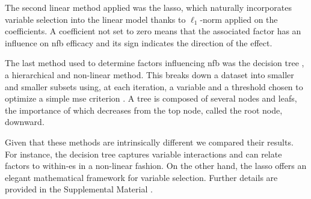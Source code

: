 The second linear method applied was the \gls{lasso}, which naturally incorporates variable selection 
into the linear model thanks to $\ell_1$-norm applied on the coefficients. A coefficient not set to zero means that 
the associated factor has an influence on \gls{nfb} efficacy and its sign indicates the direction of the effect.

The last method used to determine factors influencing \gls{nfb} was the decision tree \citep{Quinlan1986}, a hierarchical 
and non-linear method. This breaks down a dataset into smaller and smaller subsets using, at each iteration, a variable and 
a threshold chosen to optimize a simple \gls{mse} criterion \citep{James2013}. A tree is composed of several nodes and leafs, 
the importance of which decreases from the top node, called the root node, downward. 

Given that these methods are intrinsically different we compared their results. For instance, the decision
tree captures variable interactions and can relate factors to within-\gls{es} in a non-linear fashion. On the other hand, the
\gls{lasso} offers an elegant mathematical framework for variable selection. Further details are provided in the Supplemental Material
\citep{Supplementalmaterial}.















